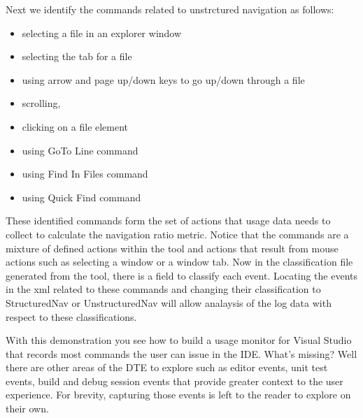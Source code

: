 Next we identify the commands related to unstrctured navigation as follows:
\begin{itemize}
\item selecting a file in an explorer window
\item selecting the tab for a file
\item using arrow and page up/down keys to go up/down through a file
\item scrolling,
\item clicking on a file element
\item using GoTo Line command
\item using Find In Files command
\item using Quick Find command
\end{itemize}

These identified commands form the set of actions that usage data needs to collect to calculate the navigation ratio metric.  Notice that the commands are a mixture of defined actions within the tool and actions that result from mouse actions such as selecting a window or a window tab.  Now in the classification file generated from the tool, there is a field to classify each event.  Locating the events in the xml related to these commands and changing their classification to StructuredNav or UnstructuredNav will allow analaysis of the log data with respect to these classifications.

With this demonstration you see how to build a usage monitor for Visual Studio that records most commands the user can issue in the IDE.  What's missing?  Well there are other areas of the DTE to explore such as editor events, unit test events, build and debug session events that provide greater context to the user experience.  For brevity, capturing those events is left to the reader to explore on their own.





